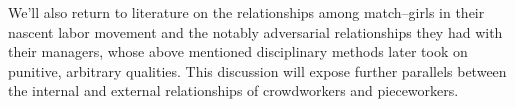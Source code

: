 \documentclass[11pt]{article}
\begin{document}


We'll also return to literature on the relationships
among match--girls in their nascent labor movement and
the notably adversarial relationships they had with their managers,
whose above mentioned disciplinary methods later took on
punitive, arbitrary qualities.
This discussion will expose further parallels between
the internal and external relationships
of crowdworkers and pieceworkers.

\end{document}
